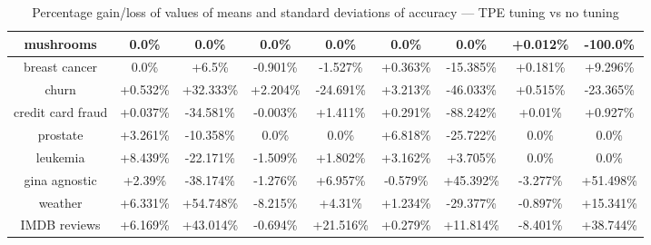 \documentclass[magisterska, english]{pwr_wmat_praca_dyplomowa}
\theoremstyle{plain}
\numberwithin{theorem}{chapter}
\theoremstyle{definition}
\numberwithin{theorem}{chapter}
\begin{document}
\begin{sidewaystable}
\begin{tabular}{c|cccccccc}
mushrooms & 0.0\% & 0.0\% & 0.0\% & 0.0\% & 0.0\% & 0.0\% & +0.012\% & -100.0\%\\ \hline
breast cancer & 0.0\% & +6.5\% & -0.901\% & -1.527\% & +0.363\% & -15.385\% & +0.181\% & +9.296\%\\ \hline
churn & +0.532\% & +32.333\% & +2.204\% & -24.691\% & +3.213\% & -46.033\% & +0.515\% & -23.365\%\\ \hline
credit card fraud & +0.037\% & -34.581\% & -0.003\% & +1.411\% & +0.291\% & -88.242\% & +0.01\% & +0.927\%\\ \hline
prostate & +3.261\% & -10.358\% & 0.0\% & 0.0\% & +6.818\% & -25.722\% & 0.0\% & 0.0\%\\ \hline
leukemia & +8.439\% & -22.171\% & -1.509\% & +1.802\% & +3.162\% & +3.705\% & 0.0\% & 0.0\%\\ \hline
gina agnostic & +2.39\% & -38.174\% & -1.276\% & +6.957\% & -0.579\% & +45.392\% & -3.277\% & +51.498\%\\ \hline
weather & +6.331\% & +54.748\% & -8.215\% & +4.31\% & +1.234\% & -29.377\% & -0.897\% & +15.341\%\\ \hline
IMDB reviews & +6.169\% & +43.014\% & -0.694\% & +21.516\% & +0.279\% & +11.814\% & -8.401\% & +38.744\%\\ \hline
\end{tabular}
\caption{Percentage gain/loss of values of means and standard deviations of accuracy --- TPE tuning vs no tuning}
\label{tab:no_tuning_tpe_accuracy_diff}


\end{sidewaystable}
\end{document}
